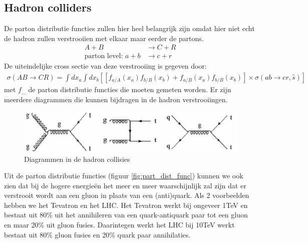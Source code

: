 \documentclass[../main.tex]{subfiles}
\begin{document}
\subsection{Hadron colliders}%
\label{sub:hadron_colliders}

De parton distributie functies zullen hier heel belangrijk zijn omdat hier niet echt de hadron zullen verstrooiien met elkaar maar eerder de partons.
\begin{equation}
    \begin{aligned}
        \label{eq:hadr_coll}
        A+B &\rightarrow C + R\\
        \text{parton level: } a+b&\rightarrow c+r
    \end{aligned}
\end{equation}
De uiteindelijke cross sectie van deze verstrooiing is gegeven door:
\begin{equation}
    \begin{aligned}
        \label{eq:hadr_coll_cross_sec}
        \sigma(AB\rightarrow CR) = \int dx_a \int dx_b \left[ \left[ f_{a/A}(x_a) f_{b/B}(x_b) + f_{a/B}(x_a) f_{b/B}(x_b) \right] \times \sigma(ab\rightarrow cr,\hat s)\right]
    \end{aligned}
\end{equation}
met $f_{...}$ de parton distributie functies die moeten gemeten worden. Er zijn meerdere diagrammen die kunnen bijdragen in de hadron verstrooiingen.

\begin{figure}[h]
    \centering
    \includegraphics[width=0.8\linewidth]{QCD/hadr_coll_diagr.png}
    \caption{Diagrammen in de hadron collisies}%
    \label{fig:QCD/hadr_coll_diagr}
\end{figure}

Uit de parton distributie functies (figuur \ref{fig:part_dist_func}) kunnen we ook zien dat bij de hogere energieën het meer en meer waarschijnlijk zal zijn dat er verstrooit wordt aan een gluon in plaats van een (anti)quark. Als 2 voorbeelden hebben we het Tevatron en het LHC. Het Tevatron werkt bij ongeveer 1TeV en bestaat uit 80\% uit het annihileren van een quark-antiquark paar tot een gluon en maar 20\% uit gluon fusies. Daarintegen werkt het LHC bij 10TeV werkt bestaat uit 80\% gluon fusies en 20\% quark paar annihilaties.
\end{document}
